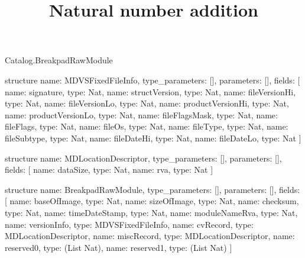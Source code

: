 \begin{lexlean}{Catalog.BreakpadRawModule}
\title{Natural number addition}
\begin{semanticmodule}
structure{
  name: MDVSFixedFileInfo,
  type_parameters: [],
  parameters: [],
  fields: [
    {name: signature, type: Nat},
    {name: structVersion, type: Nat},
    {name: fileVersionHi, type: Nat},
    {name: fileVersionLo, type: Nat},
    {name: productVersionHi, type: Nat},
    {name: productVersionLo, type: Nat},
    {name: fileFlagsMask, type: Nat},
    {name: fileFlags, type: Nat},
    {name: fileOs, type: Nat},
    {name: fileType, type: Nat},
    {name: fileSubtype, type: Nat},
    {name: fileDateHi, type: Nat},
    {name: fileDateLo, type: Nat}
  ]
}

structure{
  name: MDLocationDescriptor,
  type_parameters: [],
  parameters: [],
  fields: [
    {name: dataSize, type: Nat},
    {name: rva, type: Nat}
  ]
}

structure{
  name: BreakpadRawModule,
  type_parameters: [],
  parameters: [],
  fields: [
    {name: baseOfImage, type: Nat},
    {name: sizeOfImage, type: Nat},
    {name: checksum, type: Nat},
    {name: timeDateStamp, type: Nat},
    {name: moduleNameRva, type: Nat},
    {name: versionInfo, type: MDVSFixedFileInfo},
    {name: cvRecord, type: MDLocationDescriptor},
    {name: miscRecord, type: MDLocationDescriptor},
    {name: reserved0, type: (List Nat)},
    {name: reserved1, type: (List Nat)}
  ]
}
\end{semanticmodule}
\end{lexlean}
